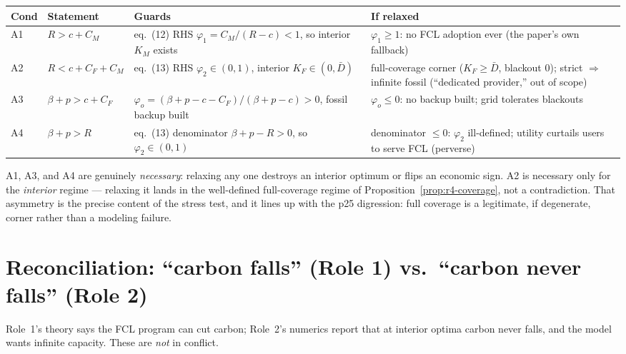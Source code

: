 \begin{center}
\begin{tabular}{p{0.7cm} p{3.0cm} p{4.0cm} p{5.0cm}}
\hline
\textbf{Cond} & \textbf{Statement} & \textbf{Guards} & \textbf{If relaxed} \\
\hline
A1 & $R > c + C_M$ & eq.~(12) RHS $\varphi_1=C_M/(R-c)<1$, so interior $K_M$ exists
   & $\varphi_1\ge 1$: no FCL adoption ever (the paper's own fallback) \\[4pt]
A2 & $R < c + C_F + C_M$ & eq.~(13) RHS $\varphi_2\in(0,1)$, interior $K_F\in(0,\bar D)$
   & full-coverage corner ($K_F\ge\bar D$, blackout $0$); strict $\Rightarrow$ infinite
     fossil (``dedicated provider,'' out of scope) \\[4pt]
A3 & $\beta+p > c + C_F$ & $\varphi_o=(\beta+p-c-C_F)/(\beta+p-c)>0$, fossil backup built
   & $\varphi_o\le 0$: no backup built; grid tolerates blackouts \\[4pt]
A4 & $\beta+p > R$ & eq.~(13) denominator $\beta+p-R>0$, so $\varphi_2\in(0,1)$
   & denominator $\le 0$: $\varphi_2$ ill-defined; utility curtails users to serve FCL
     (perverse) \\
\hline
\end{tabular}
\end{center}

\begin{remark}
A1, A3, and A4 are genuinely \emph{necessary}: relaxing any one destroys an interior
optimum or flips an economic sign. A2 is necessary only for the \emph{interior}
regime --- relaxing it lands in the well-defined full-coverage regime of
Proposition~\ref{prop:r4-coverage}, not a contradiction. That asymmetry is the precise
content of the stress test, and it lines up with the p25 digression: full coverage is
a legitimate, if degenerate, corner rather than a modeling failure.
\end{remark}

\section{Reconciliation: ``carbon falls'' (Role 1) vs.\ ``carbon never falls'' (Role 2)}
\label{sec:r4-reconcile}

Role~1's theory says the FCL program can cut carbon; Role~2's numerics report that at
interior optima carbon never falls, and the model wants infinite capacity. These are
\emph{not} in conflict.

